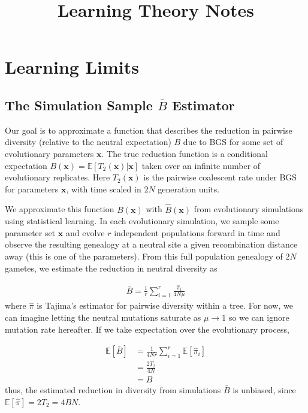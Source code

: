 \documentclass[11pt]{article}
\title{Learning Theory Notes}
\newcommand{\E}{\mathbb{E}}
\begin{document}
\maketitle


\section*{Learning Limits}

\subsection*{The Simulation Sample $\bar{B}$ Estimator}

Our goal is to approximate a function that describes the reduction in pairwise
diversity (relative to the neutral expectation) $B$ due to BGS for some set of
evolutionary parameters $\mathbf{x}$. The true reduction function is a
conditional expectation $B(\mathbf{x}) = \E[T_2(\mathbf{x}) | \mathbf{x}]$
taken over an infinite number of evolutionary replicates. Here
$T_2(\mathbf{x})$ is the pairwise coalescent rate under BGS for parameters
$\mathbf{x}$, with time scaled in $2N$ generation units.

We approximate this function $B(\mathbf{x})$ with $\widehat{B}(\mathbf{x})$
from evolutionary simulations using statistical learning. In each evolutionary
simulation, we sample some parameter set $\mathbf{x}$ and evolve $r$
independent populations forward in time and observe the resulting genealogy at
a neutral site a given recombination distance away (this is one of the
parameters). From this full population genealogy of $2N$ gametes, we estimate
the reduction in neutral diversity as

\begin{align}
  \bar{B} = \frac{1}{r} \sum_{i=1}^r \frac{\hat{\pi}_{i}}{4N\mu}
\end{align}
%
where $\hat{\pi}$ is Tajima's estimator for pairwise diversity within a tree.
For now, we can imagine letting the neutral mutations saturate as $\mu \to 1$
so we can ignore mutation rate hereafter. If we take expectation over the evolutionary
process,

\begin{align}
  \E[\bar{B}] &= \frac{1}{4Nr} \sum_{i=1}^r \E[\hat{\pi}_{i}] \\
                          &= \frac{2T_2}{4N}  \\
                          &= B
\end{align}
%
thus, the estimated reduction in diversity from simulations $\bar{B}$ is
unbiased, since $\E[\hat{\pi}] = 2T_2 = 4BN$.
\end{document}
